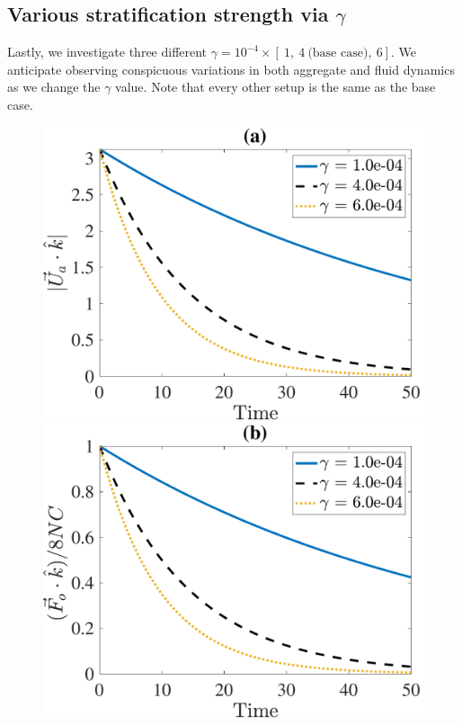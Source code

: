 \subsection{Various stratification strength via $\gamma$}
Lastly, we investigate three different $\gamma = 10^{-4} \times \left[ \ 1, \ 4 \ \text{(base case)}, \  6 \right]$. We anticipate observing conspicuous variations in both aggregate and fluid dynamics as we change the $\gamma$ value. Note that every other setup is the same as the base case. 
\begin{figure}[h]
	\begin{center}
		\includegraphics[scale=0.35]{./figures/fig_NC50_g_Ua3_all}
		\includegraphics[scale=0.35]{./figures/fig_NC50_g_Fo3_all}

\end{center}
\end{figure}
